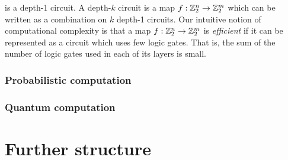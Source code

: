 \documentclass{article}
\theoremstyle{definition}
\numberwithin{figure}{section}
\begin{document}
is a depth-1 circuit. A depth-$k$ circuit is a map $f:\mathbb{Z}_2^n\to \mathbb{Z}_2^m$ which can be written as a combination on $k$ depth-1 circuits. Our intuitive notion of computational complexity is that a map $f:\mathbb{Z}_2^n\to \mathbb{Z}_2^m$ is \textit{efficient} if it can be represented as a circuit which uses few logic gates. That is, the sum of the number of logic gates used in each of its layers is small.

\subsubsection{Probabilistic computation}

\subsubsection{Quantum computation}

\section{Further structure}



\end{document}
